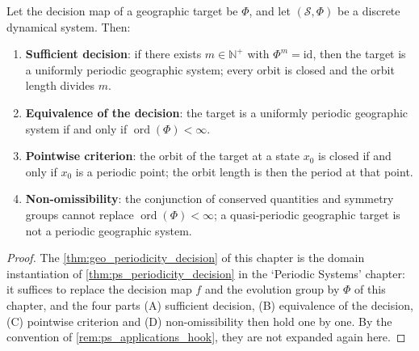 \begin{theorem}\label{thm:geo_periodicity_decision}
Let the decision map of a geographic target be $\Phi$, and let $(\mathcal S,\Phi)$ be a discrete dynamical system. Then:
\begin{enumerate}[label=(\Alph*)]
    \item \textbf{Sufficient decision}: if there exists $m\in\mathbb N^+$ with $\Phi^m=\mathrm{id}$, then the target is a uniformly periodic geographic system; every orbit is closed and the orbit length divides $m$.
    \item \textbf{Equivalence of the decision}: the target is a uniformly periodic geographic system if and only if $\operatorname{ord}(\Phi)<\infty$.
    \item \textbf{Pointwise criterion}: the orbit of the target at a state $x_0$ is closed if and only if $x_0$ is a periodic point; the orbit length is then the period at that point.
    \item \textbf{Non-omissibility}: the conjunction of conserved quantities and symmetry groups cannot replace $\operatorname{ord}(\Phi)<\infty$; a quasi-periodic geographic target is not a periodic geographic system.
\end{enumerate}
\end{theorem}

\begin{proof}
The \cref{thm:geo_periodicity_decision} of this chapter is the domain instantiation of \cref{thm:ps_periodicity_decision} in the `Periodic Systems' chapter:
it suffices to replace the decision map $f$ and the evolution group by $\Phi$ of this chapter, and the four parts (A) sufficient decision, (B) equivalence of the decision, (C) pointwise criterion and
(D) non-omissibility then hold one by one. By the convention of \cref{rem:ps_applications_hook}, they are not expanded again here.
\end{proof}

